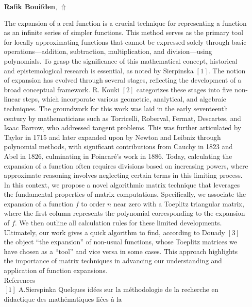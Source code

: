 \documentclass[ILAS2025-program.tex]{subfiles}
\begin{document}
\hypertarget{down0419}{}\begin{ilasabstract}
    
\textbf{Rafik Bouifden},  \hfill \hyperlink{up0419}{$\Uparrow$}
    
    
\mtskip
    The expansion of a real function is a crucial technique for representing a function as an infinite series of simpler functions. This method serves as the primary tool for locally approximating functions that cannot be expressed solely through basic operations—addition, subtraction, multiplication, and division—using polynomials.
To grasp the significance of this mathematical concept, historical and epistemological research is essential, as noted by Sierpinska $[1]$. The notion of expansion has evolved through several stages, reflecting the development of a broad conceptual framework. R. Kouki $[2]$ categorizes these stages into five non-linear steps, which incorporate various geometric, analytical, and algebraic techniques. The groundwork for this work was laid in the early seventeenth century by mathematicians such as Torricelli, Roberval, Fermat, Descartes, and Isaac Barrow, who addressed tangent problems. This was further articulated by Taylor in 1715 and later expanded upon by Newton and Leibniz through polynomial methods, with significant contributions from Cauchy in 1823 and Abel in 1826, culminating in Poincar\'e's work in 1886.
Today, calculating the expansion of a function often requires divisions based on increasing powers, where approximate reasoning involves neglecting certain terms in this limiting process. In this context, we propose a novel algorithmic matrix technique that leverages the fundamental properties of matrix computations. Specifically, we associate the expansion of a function $f$ to order $n$ near zero with a Toeplitz triangular matrix, where the first column represents the polynomial corresponding to the expansion of $f$. We then outline all calculation rules for these limited developments. Ultimately, our work gives a quick algorithm to find, according to Douady $[3]$ the object ``the expansion'' of non-usual functions, whose Toeplitz matrices we have chosen as a ``tool'' and vice
versa in some cases. This approach highlights the importance of matrix techniques in advancing our understanding and application of function expansions.
\\
References
\\
$[1]$ A.Sierspinka Quelques id\'ees sur la m\'ethodologie de la recherche en didactique des math\'ematiques li\'ees \`a la

\end{ilasabstract}
\end{document}
